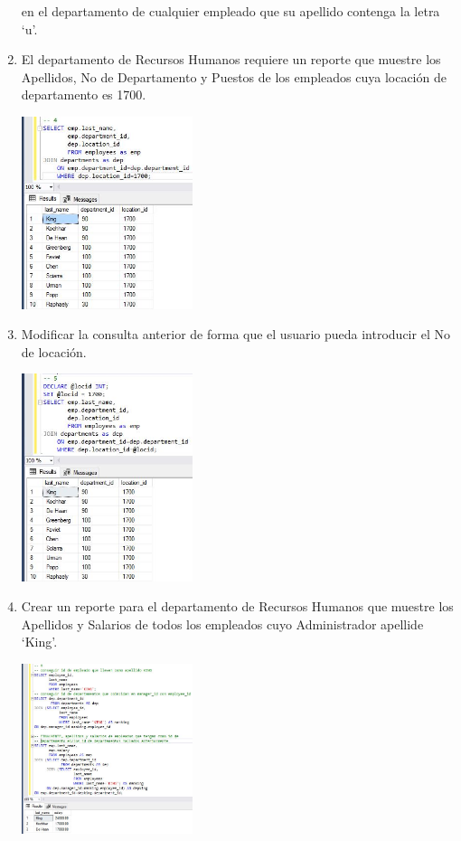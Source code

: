 \begin{enumerate}[1.]
en el departamento de cualquier empleado que su apellido contenga la letra ‘u’.
	\item El departamento de Recursos Humanos requiere un reporte que muestre los Apellidos, No de Departamento y Puestos de los empleados cuya locación de departamento es 1700.

	\begin{center}
	\includegraphics[width=5cm]{./Imagenes/actividad0904} 
	\end{center}

	\item Modificar la consulta anterior de forma que el usuario pueda introducir el No de locaci\'on.

	\begin{center}
	\includegraphics[width=5cm]{./Imagenes/actividad0905} 
	\end{center}

	\item Crear un reporte para el departamento de Recursos Humanos que muestre los Apellidos y Salarios de todos los empleados cuyo Administrador apellide ‘King’.

	\begin{center}
	\includegraphics[width=5cm]{./Imagenes/actividad0906} 
	\end{center}


\end{enumerate}
